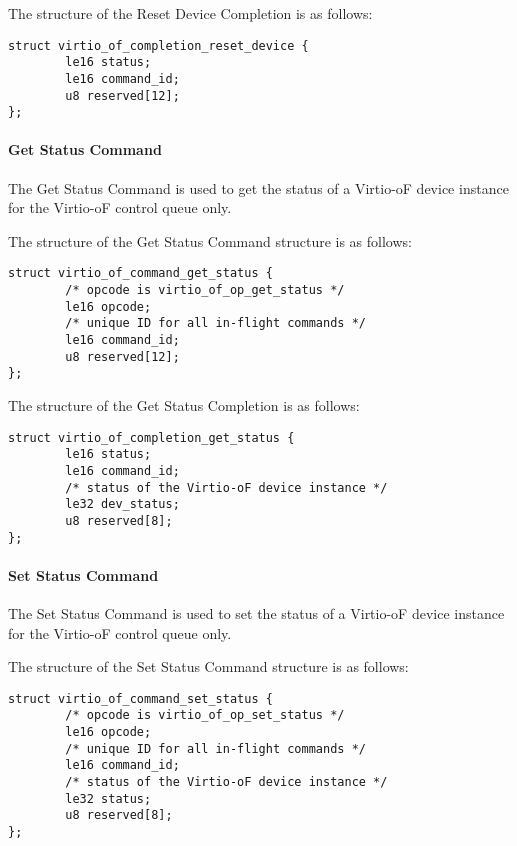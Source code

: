 The structure of the Reset Device Completion is as follows:
\begin{lstlisting}
struct virtio_of_completion_reset_device {
        le16 status;
        le16 command_id;
        u8 reserved[12];
};
\end{lstlisting}

\paragraph{Get Status Command}\label{sec:Virtio Transport Options / Virtio Over Fabrics / Commands Definition / Opcodes / Get Status Command}
The Get Status Command is used to get the status of a Virtio-oF device instance for the Virtio-oF control queue only.

The structure of the Get Status Command structure is as follows:
\begin{lstlisting}
struct virtio_of_command_get_status {
        /* opcode is virtio_of_op_get_status */
        le16 opcode;
        /* unique ID for all in-flight commands */
        le16 command_id;
        u8 reserved[12];
};
\end{lstlisting}

The structure of the Get Status Completion is as follows:
\begin{lstlisting}
struct virtio_of_completion_get_status {
        le16 status;
        le16 command_id;
        /* status of the Virtio-oF device instance */
        le32 dev_status;
        u8 reserved[8];
};
\end{lstlisting}

\paragraph{Set Status Command}\label{sec:Virtio Transport Options / Virtio Over Fabrics / Commands Definition / Opcodes / Set Status Command}
The Set Status Command is used to set the status of a Virtio-oF device instance for the Virtio-oF control queue only.

The structure of the Set Status Command structure is as follows:
\begin{lstlisting}
struct virtio_of_command_set_status {
        /* opcode is virtio_of_op_set_status */
        le16 opcode;
        /* unique ID for all in-flight commands */
        le16 command_id;
        /* status of the Virtio-oF device instance */
        le32 status;
        u8 reserved[8];
};
\end{lstlisting}

